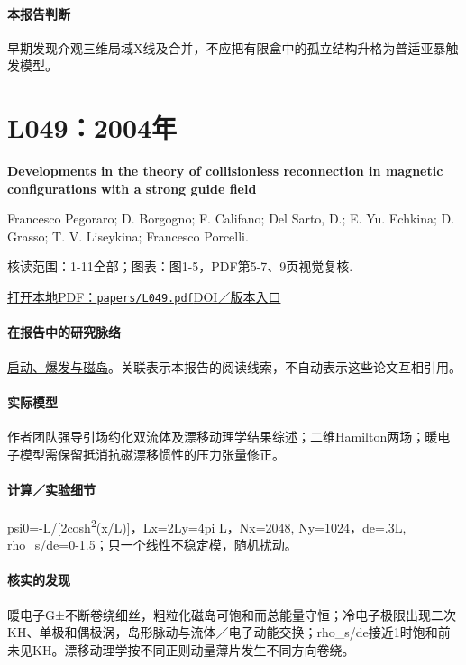 \documentclass[UTF8,a4paper,11pt,openany,fontset=fandol]{ctexbook}
\begin{document}
\paragraph{本报告判断}早期发现介观三维局域X线及合并，不应把有限盒中的孤立结构升格为普适亚暴触发模型。

\section{L049：2004年}\label{paper:L049}

\textbf{Developments in the theory of collisionless reconnection in magnetic configurations with a strong guide field}\citep{L049}\

Francesco Pegoraro;  D. Borgogno;  F. Califano;  Del Sarto,  D.;  E. Yu. Echkina;  D. Grasso;  T. V. Liseykina;  Francesco Porcelli.

\textsf{核读范围：}1-11全部；\textsf{图表：}图1-5，PDF第5-7、9页视觉复核.

\href{run:../papers/L049.pdf}{打开本地PDF：\texttt{papers/L049.pdf}}\quad\href{https://doi.org/10.5194/npg-11-567-2004}{DOI／版本入口}

\paragraph{在报告中的研究脉络}\hyperref[story:onset]{启动、爆发与磁岛}。关联表示本报告的阅读线索，不自动表示这些论文互相引用。

\paragraph{实际模型}作者团队强导引场约化双流体及漂移动理学结果综述；二维Hamilton两场；暖电子模型需保留抵消抗磁漂移惯性的压力张量修正。

\paragraph{计算／实验细节}psi0=-L/[2cosh\textsuperscript{2}(x/L)]，Lx=2Ly=4pi L，Nx=2048, Ny=1024，de=.3L, rho\_s/de=0-1.5；只一个线性不稳定模，随机扰动。

\paragraph{核实的发现}暖电子G±不断卷绕细丝，粗粒化磁岛可饱和而总能量守恒；冷电子极限出现二次KH、单极和偶极涡，岛形脉动与流体／电子动能交换；rho\_s/de接近1时饱和前未见KH。漂移动理学按不同正则动量薄片发生不同方向卷绕。
\end{document}
